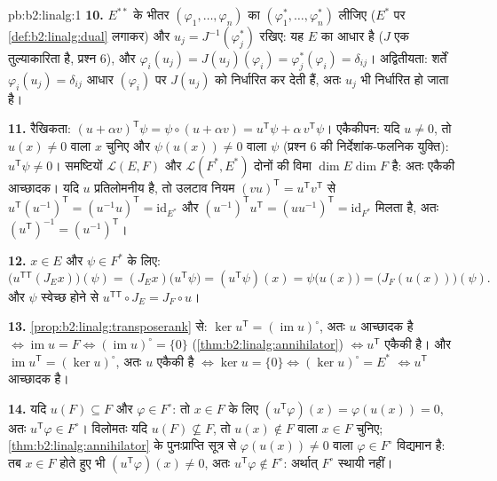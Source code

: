 \begin{solution}{pb:b2:linalg:1}
\textbf{10.} $E^{**}$ के भीतर $(\varphi_1, \dots, \varphi_n)$ का  $(\varphi_1^*, \dots,
\varphi_n^*)$ लीजिए ($E^*$ पर \cref{def:b2:linalg:dual}
लगाकर) और $u_j =
J^{-1}(\varphi_j^*)$ रखिए: यह $E$ का आधार है ($J$ एक तुल्याकारिता है, प्रश्न
6), और $\varphi_i(u_j) = J(u_j)(\varphi_i) =
\varphi_j^*(\varphi_i) = \delta_{ij}$। अद्वितीयता: शर्तें $\varphi_i(u_j) = \delta_{ij}$ आधार $(\varphi_i)$ पर $J(u_j)$ को निर्धारित कर
देती हैं, अतः $u_j$ भी निर्धारित हो जाता है।

\textbf{11.} रैखिकता: $(u + \alpha v)^{\mathsf T}\psi = \psi
\circ (u + \alpha v) = u^{\mathsf T}\psi + \alpha\, v^{\mathsf
T}\psi$। एकैकीपन: यदि $u \neq 0$, तो $u(x) \neq 0$ वाला $x$ चुनिए
और $\psi(u(x)) \neq 0$ वाला $\psi$ (प्रश्न 6 की निर्देशांक-फलनिक युक्ति): $u^{\mathsf T}\psi \neq 0$। समष्टियों
$\mathcal{L}(E,F)$ और $\mathcal{L}(F^*, E^*)$ दोनों की विमा $\dim E \dim F$ है: अतः एकैकी आच्छादक। यदि $u$
प्रतिलोमनीय है, तो उलटाव नियम $(vu)^{\mathsf
T} = u^{\mathsf T}v^{\mathsf T}$ से $u^{\mathsf
T}(u^{-1})^{\mathsf T} = (u^{-1}u)^{\mathsf T} =
\mathrm{id}_{E^*}$ और $(u^{-1})^{\mathsf T}u^{\mathsf T} =
(uu^{-1})^{\mathsf T} = \mathrm{id}_{F^*}$ मिलता है, अतः $(u^{\mathsf
T})^{-1} = (u^{-1})^{\mathsf T}$।

\textbf{12.} $x \in E$ और $\psi \in F^*$ के लिए:
\[
\bigl(u^{\mathsf T\mathsf T}(J_E x)\bigr)(\psi)
= (J_E x)\bigl(u^{\mathsf T}\psi\bigr)
= (u^{\mathsf T}\psi)(x)
= \psi\bigl(u(x)\bigr)
= \bigl(J_F(u(x))\bigr)(\psi).
\]
और $\psi$ स्वेच्छ होने से $u^{\mathsf T\mathsf T} \circ J_E = J_F
\circ u$।

\textbf{13.} \cref{prop:b2:linalg:transposerank} से: $\ker
u^{\mathsf T} = (\operatorname{im} u)^\circ$, अतः $u$ आच्छादक है $\iff \operatorname{im} u = F \iff (\operatorname{im}u)^\circ =
\{0\}$ (\cref{thm:b2:linalg:annihilator}) $\iff u^{\mathsf T}$ एकैकी है।
और $\operatorname{im} u^{\mathsf T} = (\ker
u)^\circ$, अतः $u$ एकैकी है $\iff \ker u = \{0\} \iff (\ker
u)^\circ = E^*$ $\iff u^{\mathsf T}$ आच्छादक है।

\textbf{14.} यदि $u(F) \subseteq F$ और $\varphi \in F^\circ$: तो $x \in F$ के लिए $(u^{\mathsf T}\varphi)(x) = \varphi(u(x)) = 0$, अतः $u^{\mathsf T}\varphi \in F^\circ$। विलोमतः यदि
$u(F)
\not\subseteq F$, तो $u(x) \notin F$ वाला $x \in F$ चुनिए; \cref{thm:b2:linalg:annihilator} के पुनःप्राप्ति सूत्र से $\varphi(u(x)) \neq 0$ वाला
$\varphi \in F^\circ$ विद्यमान है: तब $x \in F$ होते हुए भी $(u^{\mathsf T}\varphi)(x) \neq 0$, अतः $u^{\mathsf T}\varphi \notin F^\circ$: अर्थात् $F^\circ$
स्थायी नहीं।


\end{solution}
